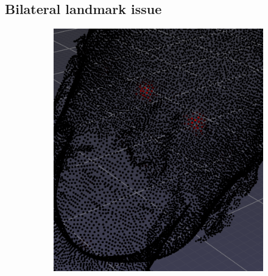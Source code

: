 \documentclass[class=article, crop=false]{standalone}
\begin{document}
\subsection{Bilateral landmark issue}\label{sec:symm_ldmk_issue}%

\begin{figure}[b]
  \centering
   \begin{subfigure}[b]{0.2708\textwidth}
  \includegraphics[width=\textwidth]{thesis/methods/import/imgs/a.png}
  \caption{}
  \label{fig:sym_ldmksa}
  \end{subfigure}
  \begin{subfigure}[b]{0.3402\textwidth}

\end{subfigure}
\end{figure}
\end{document}
